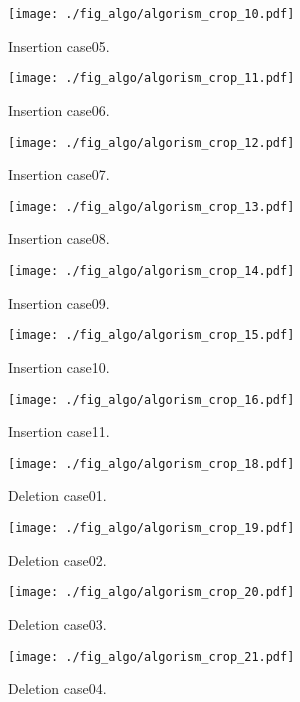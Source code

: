 \begin{figure}[h]
  \texttt{[image: ./fig\_algo/algorism\_crop\_10.pdf]}
  \caption{ Insertion case05. }
  \label{fig_IpCHashT_insert_hard_case05}

  \texttt{[image: ./fig\_algo/algorism\_crop\_11.pdf]}
  \caption{ Insertion case06. }
  \label{fig_IpCHashT_insert_hard_case06}

  \texttt{[image: ./fig\_algo/algorism\_crop\_12.pdf]}
  \caption{ Insertion case07. }
  \label{fig_IpCHashT_insert_hard_case07}

  \texttt{[image: ./fig\_algo/algorism\_crop\_13.pdf]}
  \caption{ Insertion case08. }
  \label{fig_IpCHashT_insert_hard_case08}
\end{figure}

\begin{figure}[h]
  \texttt{[image: ./fig\_algo/algorism\_crop\_14.pdf]}
  \caption{ Insertion case09. }
  \label{fig_IpCHashT_insert_hard_case09}

  \texttt{[image: ./fig\_algo/algorism\_crop\_15.pdf]}
  \caption{ Insertion case10. }
  \label{fig_IpCHashT_insert_hard_case10}

  \texttt{[image: ./fig\_algo/algorism\_crop\_16.pdf]}
  \caption{ Insertion case11. }
  \label{fig_IpCHashT_insert_hard_case11}
\end{figure}


\begin{figure}[h]
  \texttt{[image: ./fig\_algo/algorism\_crop\_18.pdf]}
  \caption{ Deletion case01. }
  \label{fig_IpCHashT_deletion_case01}

  \texttt{[image: ./fig\_algo/algorism\_crop\_19.pdf]}
  \caption{ Deletion case02. }
  \label{fig_IpCHashT_deletion_case02}

  \texttt{[image: ./fig\_algo/algorism\_crop\_20.pdf]}
  \caption{ Deletion case03. }
  \label{fig_IpCHashT_deletion_case03}

  \texttt{[image: ./fig\_algo/algorism\_crop\_21.pdf]}
  \caption{ Deletion case04. }
  \label{fig_IpCHashT_deletion_case04}
\end{figure}

